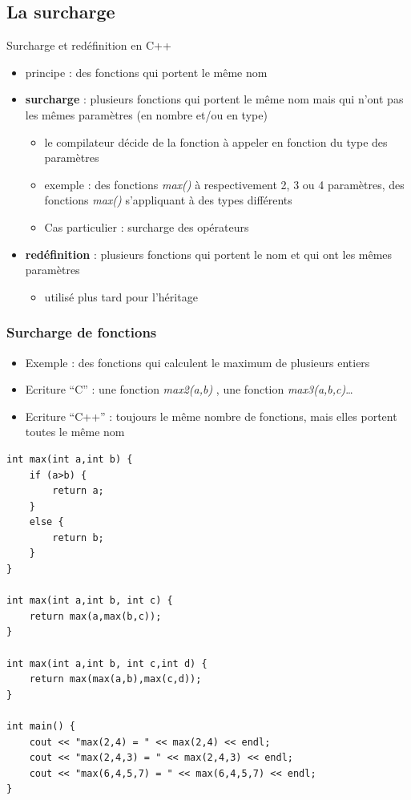 \subsection{La surcharge}
\label{sec:surcharge}

\begin{frame}{Surcharge et redéfinition en C++}

\begin{itemize}
\itemsep1pt\parskip0pt
\item
  principe : des fonctions qui portent le même nom
\item
  \textbf{surcharge} : plusieurs fonctions qui portent le même nom mais
  qui n'ont pas les mêmes paramètres (en nombre et/ou en type)

  \begin{itemize}
  \itemsep1pt\parskip0pt
  \item
    le compilateur décide de la fonction à appeler en fonction du type
    des paramètres
  \item
    exemple : des fonctions \textit{max()} à respectivement 2, 3 ou 4 paramètres, des fonctions \textit{max()} s'appliquant à des types différents
  \item
    Cas particulier : surcharge des opérateurs
  \end{itemize}
\item
  \textbf{redéfinition} : plusieurs fonctions qui portent le nom et qui
  ont les mêmes paramètres

  \begin{itemize}
  \itemsep1pt\parskip0pt
  \item
    utilisé plus tard pour l'héritage
  \end{itemize}
\end{itemize}

\end{frame}

\begin{frame}[fragile]\frametitle{Surcharge de fonctions}

\begin{itemize}
\itemsep1pt\parskip0pt
\item
  Exemple : des fonctions qui calculent le maximum de plusieurs entiers
\item
  Ecriture ``C'' : une fonction \emph{max2(a,b)} , une fonction
  \emph{max3(a,b,c)}\ldots{}
\item
  Ecriture ``C++'' : toujours le même nombre de fonctions, mais elles
  portent toutes le même nom
\end{itemize}
\begin{lstlisting}
int max(int a,int b) {
    if (a>b) {
        return a;
    }
    else {
        return b;
    }
}

int max(int a,int b, int c) {
    return max(a,max(b,c));
}

int max(int a,int b, int c,int d) {
    return max(max(a,b),max(c,d));
}

int main() {
    cout << "max(2,4) = " << max(2,4) << endl;
    cout << "max(2,4,3) = " << max(2,4,3) << endl;
    cout << "max(6,4,5,7) = " << max(6,4,5,7) << endl;
}
\end{lstlisting}
\end{frame}

